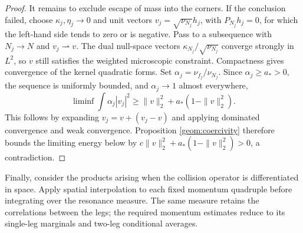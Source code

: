 \begin{proof}
It remains to exclude escape of mass into the corners.
If the conclusion failed, choose $\kappa_j,\eta_j\to0$ and unit vectors
$v_j=\sqrt{\nu_{N_j}}h_j$, with $P_{N_j}h_j=0$, for which the
left-hand side tends to zero or is negative.
Pass to a subsequence with $N_j\to N$ and $v_j\rightharpoonup v$.
The dual null-space vectors
$\kappa_{N_j}/\sqrt{\nu_{N_j}}$ converge strongly in $L^2$, so $v$
still satisfies the weighted microscopic constraint.
Compactness gives convergence of the kernel quadratic forms.
Set $\alpha_j=\nu_{f_j}/\nu_{N_j}$.
Since $\alpha_j\ge a_*>0$, the sequence is uniformly bounded, and
$\alpha_j\to1$ almost everywhere,
\[
 \liminf\int\alpha_j|v_j|^2
       \ge\|v\|_2^2+a_*(1-\|v\|_2^2).
\]
This follows by expanding $v_j=v+(v_j-v)$ and applying dominated
convergence and weak convergence.
Proposition \ref{geom:coercivity} therefore bounds the limiting energy
below by $c\|v\|_2^2+a_*(1-\|v\|_2^2)>0$, a contradiction.
\end{proof}

Finally, consider the products arising when the collision operator is
differentiated in space. Apply spatial interpolation to each fixed momentum
quadruple before integrating over the resonance measure.
The same measure retains the correlations between the legs; the required
momentum estimates reduce to its single-leg marginals and two-leg
conditional averages.

